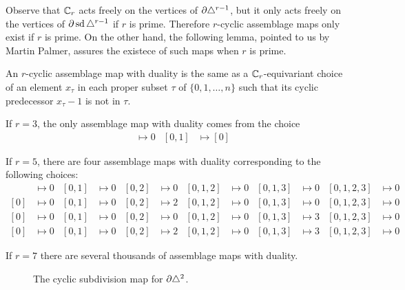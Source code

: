Observe that $\mathbb{C}_r$ acts freely on the vertices of $\partial \triangle^{r-1}$, but it only acts freely on the vertices of $\partial \operatorname{sd}\triangle^{r-1}$ if $r$ is prime. Therefore $r$-cyclic assemblage maps only exist if $r$ is prime. On the other hand, the following lemma, pointed to us by Martin Palmer, assures the existece of such maps when $r$ is prime.
\begin{lemma} An $r$-cyclic assemblage map with duality is the same as a  $\mathbb{C}_r$-equivariant choice of an element $x_\tau$ in each proper subset $\tau$ of $\{0,1,\ldots,n\}$ such that its cyclic predecessor $x_\tau-1$ is not in $\tau$.
\end{lemma}
\begin{example}
If $r=3$, the only assemblage map with duality comes from the choice
\begin{align*}
	[0]&\mapsto 0 & [0,1]&\mapsto [0]
\end{align*}
\end{example}

\begin{example}
If $r=5$, there are four assemblage maps with duality corresponding to the following choices:
\begin{align*}
	[0]&\mapsto 0 & [0,1]&\mapsto 0 & [0,2]&\mapsto 0 & [0,1,2]&\mapsto 0 & [0,1,3] & \mapsto 0 & [0,1,2,3] & \mapsto 0 \\
	[0]&\mapsto 0 & [0,1]&\mapsto 0 & [0,2]&\mapsto 2 & [0,1,2]&\mapsto 0 & [0,1,3] & \mapsto 0 & [0,1,2,3] & \mapsto 0 \\
	[0]&\mapsto 0 & [0,1]&\mapsto 0 & [0,2]&\mapsto 0 & [0,1,2]&\mapsto 0 & [0,1,3] & \mapsto 3 & [0,1,2,3] & \mapsto 0 \\
	[0]&\mapsto 0 & [0,1]&\mapsto 0 & [0,2]&\mapsto 2 & [0,1,2]&\mapsto 0 & [0,1,3] & \mapsto 3 & [0,1,2,3] & \mapsto 0
\end{align*}
\end{example}
If $r=7$ there are several thousands of assemblage maps with duality.

\begin{figure}
\caption{The cyclic subdivision map for $\partial \triangle^2$.}
\end{figure}

